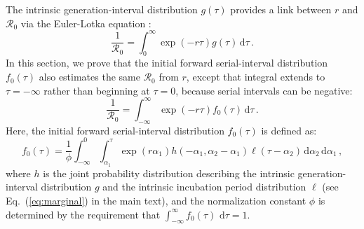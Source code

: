 \documentclass[12pt]{article}
\newcommand{\eref}[1]{Eq.~(\ref{eq:#1})}
\newcommand{\Rx}[1]{\ensuremath{{\mathcal R}_{#1}}\xspace}
\newcommand{\Ro}{\Rx{0}}
\newcommand{\dd}[1]{\ensuremath{\, \mathrm{d}#1}}
\newcommand{\dtau}{\dd{\tau}}
\newcommand{\gdist}{g} %
\newcommand{\idist}{\ell} %
\begin{document}
The intrinsic generation-interval distribution $\gdist(\tau)$ provides a link between $r$ and \Ro via the Euler-Lotka equation \citep{wallinga2007generation}:
\begin{equation}
\frac{1}{\Ro} = \int_0^\infty \exp(-r\tau) \gdist(\tau) \dtau\,.
\end{equation}
In this section, we prove that the initial forward serial-interval distribution $f_0(\tau)$ also estimates the same \Ro from $r$, except that integral extends to $\tau=-\infty$ rather than beginning at $\tau=0$, because serial intervals can be negative:
\begin{equation}
\frac{1}{\Ro} = \int_{-\infty}^\infty \exp(-r\tau) f_{0}(\tau) \dtau\,.
\label{eq:ptarget}
\end{equation}
Here, the initial forward serial-interval distribution $f_{0}(\tau)$ is defined as:
\begin{equation}
f_{0}(\tau) = \frac{1}{\phi} \int_{-\infty}^{0} \int_{\alpha_1}^{\tau} \exp(r \alpha_1) h(-\alpha_1, \alpha_2 - \alpha_1) \idist(\tau - \alpha_2) \, \mathrm{d}\alpha_2\,\mathrm{d}\alpha_1\,,
\label{eq:fdist}
\end{equation}
where $h$ is the joint probability distribution describing the
intrinsic generation-interval distribution $g$ and the intrinsic
incubation period distribution $\idist$ (see \eref{marginal} in the
main text), and the normalization constant $\phi$ is determined by the
requirement that $\int_{-\infty}^\infty f_{0}(\tau)\,\dtau=1$.
\end{document}
